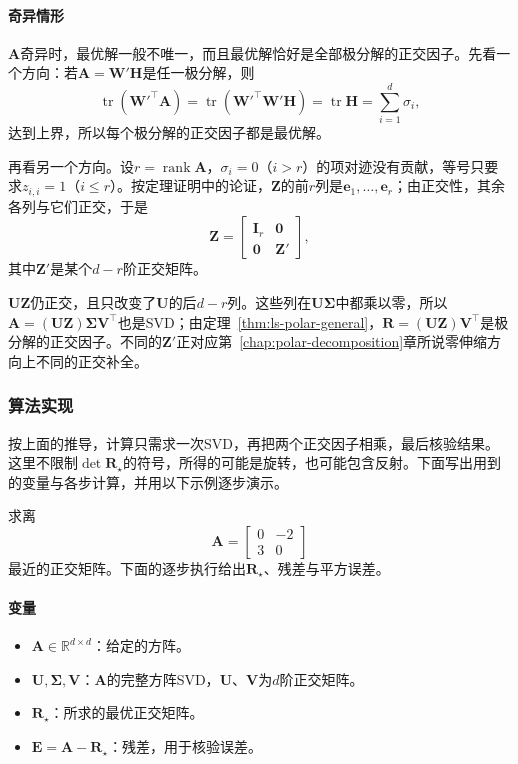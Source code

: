 \paragraph{奇异情形}
$\bm A$奇异时，最优解一般不唯一，而且最优解恰好是全部极分解的正交因子。先看一个方向：若$\bm A=\bm W'\bm H$是任一极分解，则
\[
 \operatorname{tr}(\bm W'^\top\bm A)=\operatorname{tr}(\bm W'^\top\bm W'\bm H)=\operatorname{tr}\bm H=\sum_{i=1}^d\sigma_i ,
\]
达到上界，所以每个极分解的正交因子都是最优解。

再看另一个方向。设$r=\operatorname{rank}\bm A$，$\sigma_i=0$（$i>r$）的项对迹没有贡献，等号只要求$z_{i,i}=1$（$i\leq r$）。按定理证明中的论证，$\bm Z$的前$r$列是$\bm e_1,\ldots,\bm e_r$；由正交性，其余各列与它们正交，于是
\[
 \bm Z=\begin{bmatrix}\bm I_r&\bm0\\\bm0&\bm Z'\end{bmatrix},
\]
其中$\bm Z'$是某个$d-r$阶正交矩阵。

$\bm U\bm Z$仍正交，且只改变了$\bm U$的后$d-r$列。这些列在$\bm U\bm\Sigma$中都乘以零，所以$\bm A=(\bm U\bm Z)\bm\Sigma\bm V^\top$也是SVD；由定理~\ref{thm:ls-polar-general}，$\bm R=(\bm U\bm Z)\bm V^\top$是极分解的正交因子。不同的$\bm Z'$正对应第~\ref{chap:polar-decomposition}章所说零伸缩方向上不同的正交补全。

\subsubsection{算法实现}

按上面的推导，计算只需求一次SVD，再把两个正交因子相乘，最后核验结果。这里不限制$\det\bm R_\star$的符号，所得的可能是旋转，也可能包含反射。下面写出用到的变量与各步计算，并用以下示例逐步演示。

\begin{example}[二阶正交逼近]
\label{ex:matrix-approximation-orthogonal-two-by-two}
求离
\[
 \bm A=\begin{bmatrix}0&-2\\3&0\end{bmatrix}
\]
最近的正交矩阵。下面的逐步执行给出$\bm R_\star$、残差与平方误差。
\end{example}

\paragraph{变量}
\begin{itemize}
 \item $\bm A\in\mathbb R^{d\times d}$：给定的方阵。
 \item $\bm U,\bm\Sigma,\bm V$：$\bm A$的完整方阵SVD，$\bm U$、$\bm V$为$d$阶正交矩阵。
 \item $\bm R_\star$：所求的最优正交矩阵。
 \item $\bm E=\bm A-\bm R_\star$：残差，用于核验误差。
\end{itemize}

